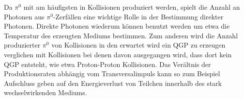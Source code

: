Da $\pi^{0}$ mit am h\"aufigsten in Kollisionen produziert werden, spielt die Anzahl an Photonen aus $\pi^{0}$-Zerf\"allen eine wichtige Rolle in der Bestimmung direkter Photonen.
Direkte Photonen wiederum k\"onnen benutzt werden um etwa die Temperatur des erzeugten Mediums bestimmen.
\newline
Zum anderen wird die Anzahl produzierter $\pi^{0}$ von Kollisionen in den erwartet wird ein QGP zu erzeugen verglichen mit Kollisionen bei denen davon ausgegangen wird, dass dort kein QGP entsteht, wie etwa Proton-Proton Kollisionen.
Das Ver\"altnis der Produktionsraten abh\"angig vom Transversalimpuls kann so zum Beispiel Aufschluss geben auf den Energieverlust von Teilchen innerhalb des stark wechselwirkenden Mediums. 
